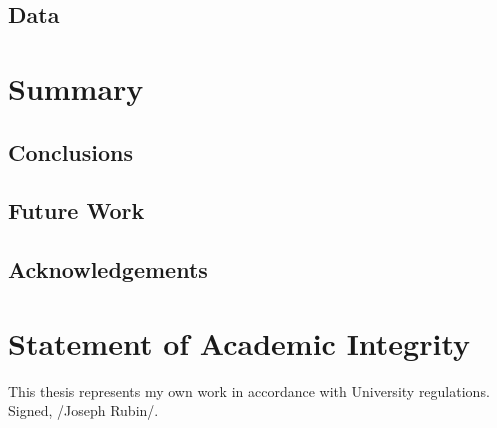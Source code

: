\documentclass{article}
\begin{document}
\subsection{Data}
\section{Summary}
\subsection{Conclusions}
\subsection{Future Work}
\subsection{Acknowledgements}
\section*{Statement of Academic Integrity}
This thesis represents my own work in accordance with University regulations.\\
Signed, /Joseph Rubin/.

\nocite{*}


\end{document}
